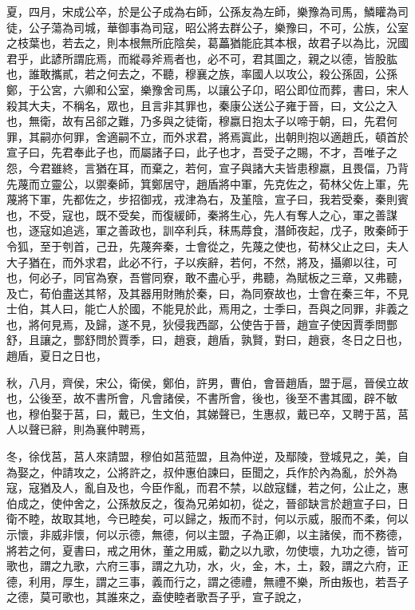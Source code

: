 \documentclass{ctexart}
\begin{document}
夏，四月，宋成公卒，於是公子成為右師，公孫友為左師，樂豫為司馬，鱗矔為司徒，公子蕩為司城，華御事為司寇，昭公將去群公子，樂豫曰，不可，公族，公室之枝葉也，若去之，則本根無所庇陰矣，葛藟猶能庇其本根，故君子以為比，況國君乎，此諺所謂庇焉，而縱尋斧焉者也，必不可，君其圖之，親之以德，皆股肱也，誰敢攜貳，若之何去之，不聽，穆襄之族，率國人以攻公，殺公孫固，公孫鄭，于公宮，六卿和公室，樂豫舍司馬，以讓公子卬，昭公即位而葬，書曰，宋人殺其大夫，不稱名，眾也，且言非其罪也，秦康公送公子雍于晉，曰，文公之入也，無衛，故有呂郤之難，乃多與之徒衛，穆嬴日抱太子以啼于朝，曰，先君何罪，其嗣亦何罪，舍適嗣不立，而外求君，將焉寘此，出朝則抱以適趙氏，頓首於宣子曰，先君奉此子也，而屬諸子曰，此子也才，吾受子之賜，不才，吾唯子之怨，今君雖終，言猶在耳，而棄之，若何，宣子與諸大夫皆患穆嬴，且畏偪，乃背先蔑而立靈公，以禦秦師，箕鄭居守，趙盾將中軍，先克佐之，荀林父佐上軍，先蔑將下軍，先都佐之，步招御戎，戎津為右，及堇陰，宣子曰，我若受秦，秦則賓也，不受，寇也，既不受矣，而復緩師，秦將生心，先人有奪人之心，軍之善謀也，逐寇如追逃，軍之善政也，訓卒利兵，秣馬蓐食，潛師夜起，戊子，敗秦師于令狐，至于刳首，己丑，先蔑奔秦，士會從之，先蔑之使也，荀林父止之曰，夫人大子猶在，而外求君，此必不行，子以疾辭，若何，不然，將及，攝卿以往，可也，何必子，同官為寮，吾嘗同寮，敢不盡心乎，弗聽，為賦板之三章，又弗聽，及亡，荀伯盡送其帑，及其器用財賄於秦，曰，為同寮故也，士會在秦三年，不見士伯，其人曰，能亡人於國，不能見於此，焉用之，士季曰，吾與之同罪，非義之也，將何見焉，及歸，遂不見，狄侵我西鄙，公使告于晉，趙宣子使因賈季問酆舒，且讓之，酆舒問於賈季，曰，趙衰，趙盾，孰賢，對曰，趙衰，冬日之日也，趙盾，夏日之日也，

秋，八月，齊侯，宋公，衛侯，鄭伯，許男，曹伯，會晉趙盾，盟于扈，晉侯立故也，公後至，故不書所會，凡會諸侯，不書所會，後也，後至不書其國，辟不敏也，穆伯娶于莒，曰，戴已，生文伯，其娣聲已，生惠叔，戴已卒，又聘于莒，莒人以聲已辭，則為襄仲聘焉，

冬，徐伐莒，莒人來請盟，穆伯如莒蒞盟，且為仲逆，及鄢陵，登城見之，美，自為娶之，仲請攻之，公將許之，叔仲惠伯諫曰，臣聞之，兵作於內為亂，於外為寇，寇猶及人，亂自及也，今臣作亂，而君不禁，以啟寇讎，若之何，公止之，惠伯成之，使仲舍之，公孫敖反之，復為兄弟如初，從之，晉郤缺言於趙宣子曰，日衛不睦，故取其地，今已睦矣，可以歸之，叛而不討，何以示威，服而不柔，何以示懷，非威非懷，何以示德，無德，何以主盟，子為正卿，以主諸侯，而不務德，將若之何，夏書曰，戒之用休，董之用威，勸之以九歌，勿使壞，九功之德，皆可歌也，謂之九歌，六府三事，謂之九功，水，火，金，木，土，穀，謂之六府，正德，利用，厚生，謂之三事，義而行之，謂之德禮，無禮不樂，所由叛也，若吾子之德，莫可歌也，其誰來之，盍使睦者歌吾子乎，宣子說之，
\end{document}
